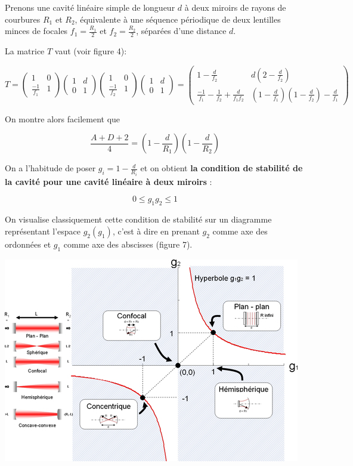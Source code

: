\documentclass{book}
\begin{document}
Prenons une cavité linéaire simple de longueur $d$ à deux miroirs de rayons de courbures $R_1$ et $R_2$, équivalente à une séquence périodique de deux lentilles minces de focales $f_1 = \frac {R_1} 2$ et
$f_2 = \frac{R_2}2$, séparées d'une distance $d$. 

 La matrice $T$ vaut (voir figure 4): 

$$T = \begin{pmatrix} 1 & 0 \\ \frac {-1}{f_1} & 1 \end{pmatrix}
            \begin{pmatrix} 1 & d \\ 0 & 1 \end{pmatrix} \begin{pmatrix} 1 & 0 \\ \frac {-1}{f_2} & 1 \end{pmatrix}
            \begin{pmatrix} 1 & d \\ 0 & 1 \end{pmatrix} = \begin{pmatrix} 1-\frac d {f_2} & d\left(2-\frac d
            {f_2}\right) \\ \frac {-1}{f_1}-\frac {1}{f_2}+\frac {d}{f_1f_2} & \left(1-\frac d {f_1}\right)\left(1-\frac
            d {f_2}\right) - \frac d {f_1} \end{pmatrix}$$

On montre alors facilement que

$$\frac{A+D+2}4=\left(1-\frac d{R_1}\right)\left(1-\frac d{R_2}\right)$$

On a l'habitude de poser $g_i=1-\frac d {R_i}$ et on obtient \textbf{\color{red}la condition de stabilité de la cavité pour une cavité linéaire à deux miroirs} :

$$0\leq g_1g_2 \leq 1$$

On visualise classiquement cette condition de stabilité sur un diagramme représentant l'espace $g_2(g_1)$, c'est à dire en prenant $g_2$ comme axe des ordonnées et $g_1$ comme axe des abscisses (figure 7).

{\centering
\includegraphics[scale=1.7]{images/fig07.jpg}
\par}
\end{document}
